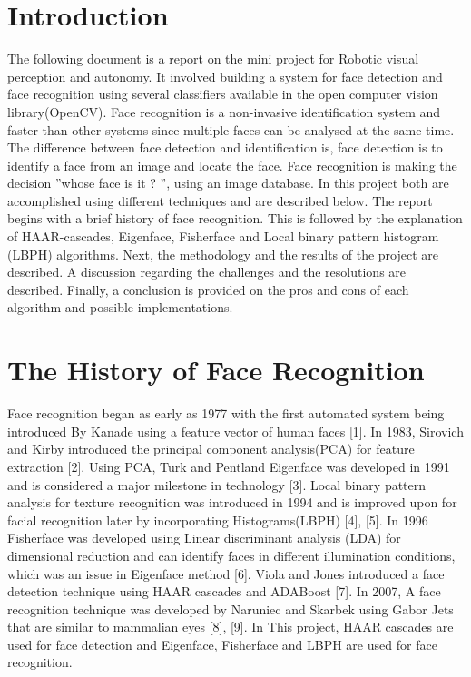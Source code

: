 \documentclass[11pt]{article}
\begin{document}
\section{Introduction}
The following document is a report on the mini project for Robotic visual perception and autonomy. It
involved building a system for face detection and face recognition using several classifiers available in
the open computer vision library(OpenCV). Face recognition is a non-invasive identification system and
faster than other systems since multiple faces can be analysed at the same time. The difference between
face detection and identification is, face detection is to identify a face from an image and locate the face.
Face recognition is making the decision ”whose face is it ? ”, using an image database. In this project
both are accomplished using different techniques and are described below. The report begins with a brief
history of face recognition. This is followed by the explanation of HAAR-cascades, Eigenface, Fisherface
and Local binary pattern histogram (LBPH) algorithms. Next, the methodology and the results of the
project are described. A discussion regarding the challenges and the resolutions are described. Finally, a
conclusion is provided on the pros and cons of each algorithm and possible implementations.
\section{The History of Face Recognition}
Face recognition began as early as 1977 with the first automated system being introduced By Kanade
using a feature vector of human faces [1]. In 1983, Sirovich and Kirby introduced the principal component
analysis(PCA) for feature extraction [2]. Using PCA, Turk and Pentland Eigenface was developed in
1991 and is considered a major milestone in technology [3]. Local binary pattern analysis for texture
recognition was introduced in 1994 and is improved upon for facial recognition later by incorporating
Histograms(LBPH) [4], [5]. In 1996 Fisherface was developed using Linear discriminant analysis (LDA)
for dimensional reduction and can identify faces in different illumination conditions, which was an issue
in Eigenface method [6]. Viola and Jones introduced a face detection technique using HAAR cascades
and ADABoost [7]. In 2007, A face recognition technique was developed by Naruniec and Skarbek using
Gabor Jets that are similar to mammalian eyes [8], [9]. In This project, HAAR cascades are used for face
detection and Eigenface, Fisherface and LBPH are used for face recognition.
\end{document}
